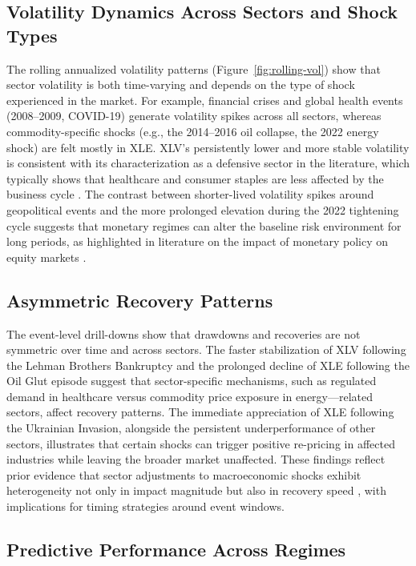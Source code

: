 \documentclass[12pt]{article}
\begin{document}
\subsection{Volatility Dynamics Across Sectors and Shock Types}

The rolling annualized volatility patterns (Figure~\ref{fig:rolling-vol}) show that sector volatility is both time-varying and depends on the type of shock experienced in the market. For example, financial crises and global health events (2008--2009, COVID-19) generate volatility spikes across all sectors, whereas commodity-specific shocks (e.g., the 2014--2016 oil collapse, the 2022 energy shock) are felt mostly in XLE. XLV’s persistently lower and more stable volatility is consistent with its characterization as a defensive sector in the literature, which typically shows that healthcare and consumer staples are less affected by the business cycle \cite{sprague2024healthcare}. The contrast between shorter-lived volatility spikes around geopolitical events and the more prolonged elevation during the 2022 tightening cycle suggests that monetary regimes can alter the baseline risk environment for long periods, as highlighted in literature on the impact of monetary policy on equity markets \cite{ewing2003}.

\subsection{Asymmetric Recovery Patterns}

The event-level drill-downs show that drawdowns and recoveries are not symmetric over time and across sectors. The faster stabilization of XLV following the Lehman Brothers Bankruptcy and the prolonged decline of XLE following the Oil Glut episode suggest that sector-specific mechanisms, such as regulated demand in healthcare versus commodity price exposure in energy—related sectors, affect recovery patterns. The immediate appreciation of XLE following the Ukrainian Invasion, alongside the persistent underperformance of other sectors, illustrates that certain shocks can trigger positive re-pricing in affected industries while leaving the broader market unaffected. These findings reflect prior evidence that sector adjustments to macroeconomic shocks exhibit heterogeneity not only in impact magnitude but also in recovery speed \cite{ewing2003}, with implications for timing strategies around event windows.

\subsection{Predictive Performance Across Regimes}
\end{document}
